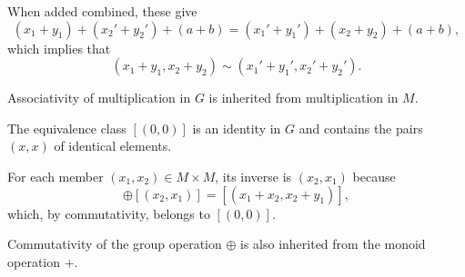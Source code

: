 \begin{defproof}
  When added combined, these give
  \begin{equation*}
    (x_1 + y_1) + (x_2' + y_2') + (a + b)
    =
    (x_1' + y_1') + (x_2 + y_2) + (a + b),
  \end{equation*}
  which implies that
  \begin{equation*}
    (x_1 + y_1, x_2 + y_2) \sim (x_1' + y_1', x_2' + y_2').
  \end{equation*}

   Associativity of multiplication in \( G \) is inherited from multiplication in \( M \).

   The equivalence class \( [(0, 0)] \) is an identity in \( G \) and contains the pairs \( (x, x) \) of identical elements.

   For each member \( (x_1, x_2) \in M \times M \), its inverse is \( (x_2, x_1) \) because
  \begin{equation*}
    [(x_1, x_2)] \oplus [(x_2, x_1)] = [(x_1 + x_2, x_2 + y_1)],
  \end{equation*}
  which, by commutativity, belongs to \( [(0, 0)] \).

   Commutativity of the group operation \( \oplus \) is also inherited from the monoid operation \( + \).
\end{defproof}

